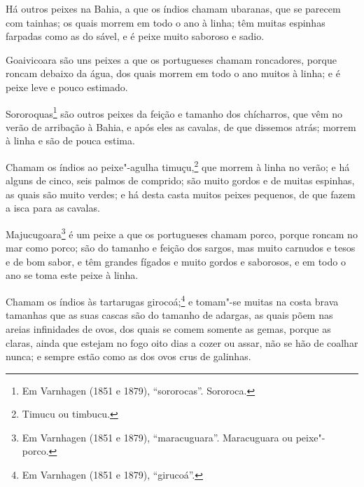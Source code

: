 Há outros peixes na Bahia, a que os índios chamam ubaranas, que se parecem com tainhas; os
quais morrem em todo o ano à linha; têm muitas espinhas farpadas como as do sável, e é
peixe muito saboroso e sadio.

Goaivicoara são uns peixes a que os portugueses chamam roncadores, porque roncam debaixo
da água, dos quais morrem em todo o ano muitos à linha; e é peixe leve e pouco estimado.

Sororoquas\footnote{ Em Varnhagen (1851 e 1879), ``sororocas''. Sororoca.} são outros
peixes da feição e tamanho dos chícharros, que vêm no verão de arribação à Bahia, e após
eles as cavalas, de que dissemos atrás; morrem à linha e são de pouca estima.

Chamam os índios ao peixe"-agulha timuçu,\footnote{ Timucu ou timbucu.} que morrem à linha
no verão; e há alguns de cinco, seis palmos de comprido; são muito gordos e de muitas
espinhas, as quais são muito verdes; e há desta casta muitos peixes pequenos, de que fazem
a isca para as cavalas.

Majucugoara\footnote{ Em Varnhagen (1851 e 1879), ``maracuguara''. Maracuguara ou
peixe"-porco.} é um peixe a que os portugueses chamam porco, porque roncam no mar como
porco; são do tamanho e feição dos sargos, mas muito carnudos e tesos e de bom sabor, e
têm grandes fígados e muito gordos e saborosos, e em todo o ano se toma este peixe à
linha.

Chamam os índios às tartarugas girocoá;\footnote{ Em Varnhagen (1851 e 1879),
``girucoá''.} e tomam"-se muitas na costa brava tamanhas que as suas cascas são do tamanho
de adargas, as quais põem nas areias infinidades de ovos, dos quais se comem somente as
gemas, porque as claras, ainda que estejam no fogo oito dias a cozer ou assar, não se hão
de coalhar nunca; e sempre estão como as dos ovos crus de galinhas.

